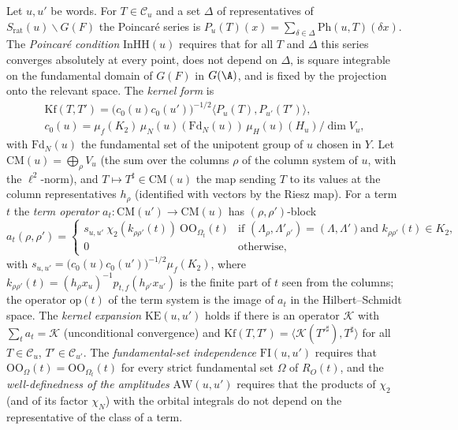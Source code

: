 \begin{definition}\label{pf:sh-siegel:kexpdef}
Let $u,u'$ be words. For $T\in\mathcal C_u$ and a set $\Delta$ of representatives of $S_{\mathrm{rat}}(u)\backslash G(F)$
the Poincar\'e series is $P_u(T)(x)=\sum_{\delta\in\Delta}\mathrm{Ph}(u,T)(\delta x)$. The \emph{Poincar\'e condition}
$\mathrm{InHH}(u)$ requires that for all $T$ and $\Delta$ this series converges absolutely at every point, does not depend on
$\Delta$, is square integrable on the fundamental domain of $G(F)$ in $G(\A)$, and is fixed by the projection onto the
relevant space. The \emph{kernel form} is
\begin{gather*}
\mathrm{Kf}(T,T')=\bigl(c_0(u)c_0(u')\bigr)^{-1/2}\bigl\langle P_u(T),P_{u'}(T')\bigr\rangle,\\
c_0(u)=\mu_f(K_2)\,\mu_N(u)(\mathrm{Fd}_N(u))\,\mu_H(u)(H_u)/\dim V_u ,
\end{gather*}
with $\mathrm{Fd}_N(u)$ the fundamental set of the unipotent group of $u$ chosen in $Y$. Let $\mathrm{CM}(u)=\bigoplus_\rho V_u$
(the sum over the columns $\rho$ of the column system of $u$, with the $\ell^2$-norm), and $T\mapsto T^\sharp\in\mathrm{CM}(u)$
the map sending $T$ to its values at the column representatives $h_\rho$ (identified with vectors by the Riesz map). For a
term $t$ the \emph{term operator} $a_t\colon\mathrm{CM}(u')\to\mathrm{CM}(u)$ has $(\rho,\rho')$-block
\[
a_t(\rho,\rho')=
\begin{cases}
s_{u,u'}\ \chi_2(k_{\rho\rho'}(t))\ \mathrm{OO}_{\Omega_t}(t)&\text{if $(\Lambda_\rho,\Lambda'_{\rho'})=(\Lambda,\Lambda')$
and $k_{\rho\rho'}(t)\in K_2$,}\\
0&\text{otherwise,}
\end{cases}
\]
with $s_{u,u'}=\bigl(c_0(u)c_0(u')\bigr)^{-1/2}\mu_f(K_2)$, where $k_{\rho\rho'}(t)=(h_\rho x_u)^{-1}p_{t,f}(h_{\rho'}x_{u'})$ is
the finite part of $t$ seen from the columns; the
operator $\mathrm{op}(t)$ of the term system is the image of $a_t$ in the Hilbert--Schmidt space. The \emph{kernel
expansion} $\mathrm{KE}(u,u')$ holds if there is an operator $\mathcal K$ with $\sum_ta_t=\mathcal K$ (unconditional
convergence) and $\mathrm{Kf}(T,T')=\langle\mathcal K(T'^\sharp),T^\sharp\rangle$ for all $T\in\mathcal C_u$, $T'\in\mathcal
C_{u'}$. The \emph{fundamental-set independence} $\mathrm{FI}(u,u')$ requires that $\mathrm{OO}_\Omega(t)=\mathrm{OO}_{\Omega_t}(t)$
for every strict fundamental set $\Omega$ of $R_O(t)$, and the \emph{well-definedness of the amplitudes}
$\mathrm{AW}(u,u')$ requires that the products of $\chi_2$ (and of its factor $\chi_N$) with the orbital integrals do not
depend on the representative of the class of a term.
\ \
\ 
\end{definition}


